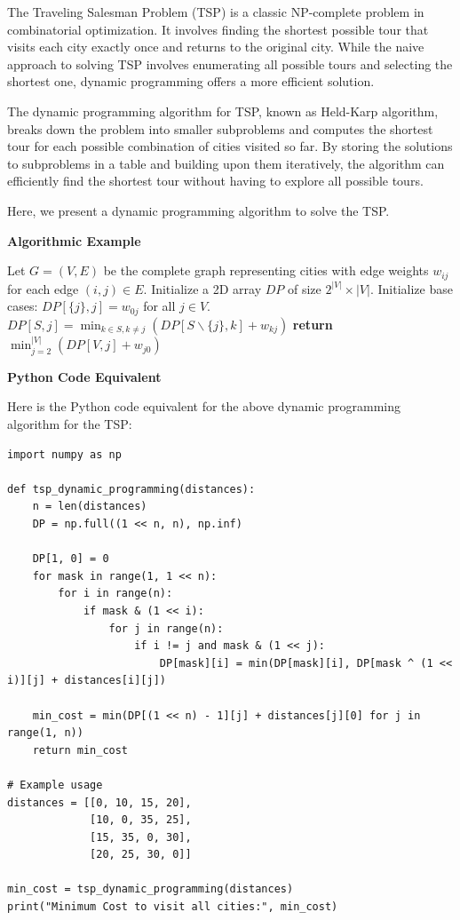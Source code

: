 \documentclass[12pt]{book} %
\begin{document}
The Traveling Salesman Problem (TSP) is a classic NP-complete problem in combinatorial optimization. It involves finding the shortest possible tour that visits each city exactly once and returns to the original city. While the naive approach to solving TSP involves enumerating all possible tours and selecting the shortest one, dynamic programming offers a more efficient solution.

The dynamic programming algorithm for TSP, known as Held-Karp algorithm, breaks down the problem into smaller subproblems and computes the shortest tour for each possible combination of cities visited so far. By storing the solutions to subproblems in a table and building upon them iteratively, the algorithm can efficiently find the shortest tour without having to explore all possible tours.

Here, we present a dynamic programming algorithm to solve the TSP.

\textbf{Algorithmic Example}
\FloatBarrier
\begin{algorithm}
\caption{Dynamic Programming for TSP}
\begin{algorithmic}[1]
\State Let $G=(V,E)$ be the complete graph representing cities with edge weights $w_{ij}$ for each edge $(i,j) \in E$.
\State Initialize a 2D array $DP$ of size $2^{|V|} \times |V|$.
\State Initialize base cases: $DP[\{j\},j] = w_{0j}$ for all $j \in V$.
            \State $DP[S, j] = \min_{k \in S, k \neq j}(DP[S \backslash \{j\}, k] + w_{kj})$
        \EndFor
    \EndFor
\EndFor
\State \textbf{return} $\min_{j=2}^{|V|}(DP[V, j] + w_{j0})$
\end{algorithmic}
\end{algorithm}
\FloatBarrier
\textbf{Python Code Equivalent}

Here is the Python code equivalent for the above dynamic programming algorithm for the TSP:
\FloatBarrier
\begin{lstlisting}
import numpy as np

def tsp_dynamic_programming(distances):
    n = len(distances)
    DP = np.full((1 << n, n), np.inf)
    
    DP[1, 0] = 0
    for mask in range(1, 1 << n):
        for i in range(n):
            if mask & (1 << i):
                for j in range(n):
                    if i != j and mask & (1 << j):
                        DP[mask][i] = min(DP[mask][i], DP[mask ^ (1 << i)][j] + distances[i][j])
    
    min_cost = min(DP[(1 << n) - 1][j] + distances[j][0] for j in range(1, n))
    return min_cost

# Example usage
distances = [[0, 10, 15, 20],
             [10, 0, 35, 25],
             [15, 35, 0, 30],
             [20, 25, 30, 0]]

min_cost = tsp_dynamic_programming(distances)
print("Minimum Cost to visit all cities:", min_cost)
\end{lstlisting}
\FloatBarrier
\end{document}

